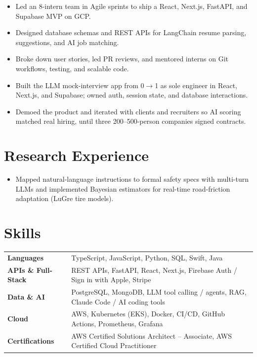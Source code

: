 \documentclass[11pt, letterpaper]{article}
\begin{document}
\vspace{1pt}
\begin{itemize}
  \item Led an 8-intern team in Agile sprints to ship a React, Next.js, FastAPI, and Supabase MVP on GCP.
  \item Designed database schemas and REST APIs for LangChain resume parsing, suggestions, and AI job matching.
  \item Broke down user stories, led PR reviews, and mentored interns on Git workflows, testing, and scalable code.
\end{itemize}

\vspace{1pt}
\begin{itemize}
  \item Built the LLM mock-interview app from 0$\to$1 as sole engineer in React, Next.js, and Supabase; owned auth, session state, and database interactions.
  \item Demoed the product and iterated with clients and recruiters so AI scoring matched real hiring, until three 200--500-person companies signed contracts.
\end{itemize}

\section{Research Experience}
\begin{itemize}
  \item Mapped natural-language instructions to formal safety specs with multi-turn LLMs and implemented Bayesian estimators for real-time road-friction adaptation (LuGre tire models).
\end{itemize}

\section{Skills}
\begin{tabularx}{\textwidth}{@{}l @{\hspace{7pt}} >{\raggedright\arraybackslash}X@{}}
  \textbf{Languages} & TypeScript, JavaScript, Python, SQL, Swift, Java \\[1pt]
  \textbf{APIs \& Full-Stack} & REST APIs, FastAPI, React, Next.js, Firebase Auth / Sign in with Apple, Stripe \\[1pt]
  \textbf{Data \& AI} & PostgreSQL, MongoDB, LLM tool calling / agents, RAG, Claude Code / AI coding tools \\[1pt]
  \textbf{Cloud} & AWS, Kubernetes (EKS), Docker, CI/CD, GitHub Actions, Prometheus, Grafana \\[1pt]
  \textbf{Certifications} & AWS Certified Solutions Architect -- Associate, AWS Certified Cloud Practitioner \\
\end{tabularx}
\end{document}

